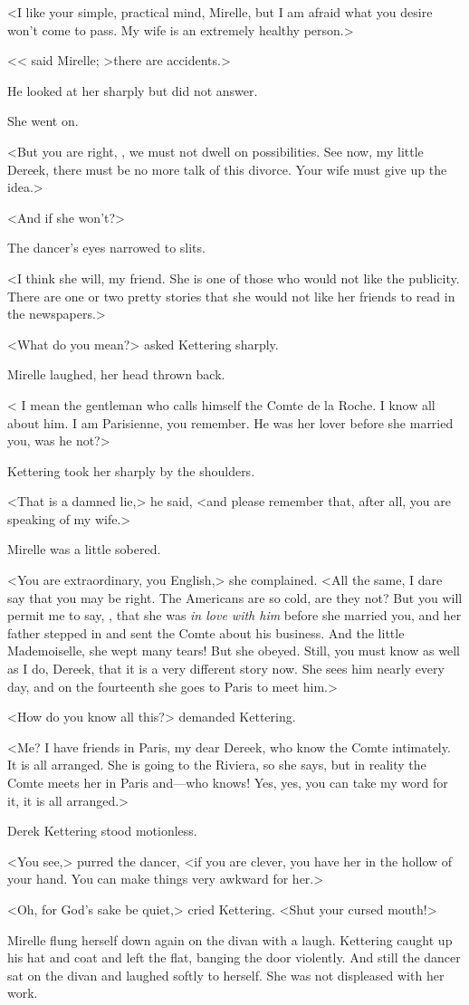 <I like your simple, practical mind, Mirelle, but I am afraid what you desire won't come to pass. My wife is an extremely healthy person.>

<< said Mirelle; >there are accidents.>

He looked at her sharply but did not answer.

She went on.

<But you are right, , we must not dwell on possibilities. See now, my little Dereek, there must be no more talk of this divorce. Your wife must give up the idea.>

<And if she won't?>

The dancer's eyes narrowed to slits.

<I think she will, my friend. She is one of those who would not like the publicity. There are one or two pretty stories that she would not like her friends to read in the newspapers.>

<What do you mean?> asked Kettering sharply.

Mirelle laughed, her head thrown back.

< I mean the gentleman who calls himself the Comte de la Roche. I know all about him. I am Parisienne, you remember. He was her lover before she married you, was he not?>

Kettering took her sharply by the shoulders.

<That is a damned lie,> he said, <and please remember that, after all, you are speaking of my wife.>

Mirelle was a little sobered.

<You are extraordinary, you English,> she complained. <All the same, I dare say that you may be right. The Americans are so cold, are they not? But you will permit me to say, , that she was \emph{in love with him} before she married you, and her father stepped in and sent the Comte about his business. And the little Mademoiselle, she wept many tears! But she obeyed. Still, you must know as well as I do, Dereek, that it is a very different story now. She sees him nearly every day, and on the fourteenth she goes to Paris to meet him.>

<How do you know all this?> demanded Kettering.

<Me? I have friends in Paris, my dear Dereek, who know the Comte intimately. It is all arranged. She is going to the Riviera, so she says, but in reality the Comte meets her in Paris and—who knows! Yes, yes, you can take my word for it, it is all arranged.>

Derek Kettering stood motionless.

<You see,> purred the dancer, <if you are clever, you have her in the hollow of your hand. You can make things very awkward for her.>

<Oh, for God's sake be quiet,> cried Kettering. <Shut your cursed mouth!>

Mirelle flung herself down again on the divan with a laugh. Kettering caught up his hat and coat and left the flat, banging the door violently. And still the dancer sat on the divan and laughed softly to herself. She was not displeased with her work.